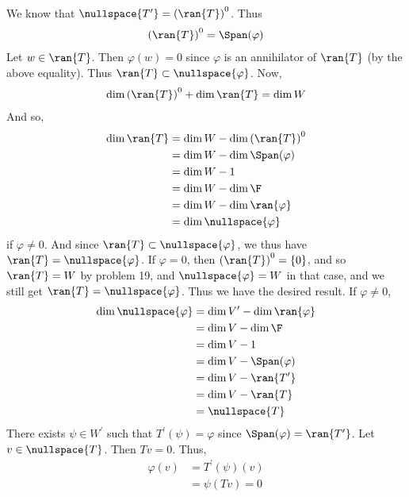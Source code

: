 \documentclass{book}
\begin{document}
\begin{enumerate}[label=\arabic*)]
      We know that $\nullspace{T^{\prime}} = \left( \ran{T} \right)^0$. Thus
      \begin{align*}
        \left( \ran{T} \right)^0 = \Span(\varphi)
      \end{align*}
      Let $w \in \ran{T}$. Then $\varphi(w) = 0$ since $\varphi$ is an annihilator of $\ran{T}$ (by the above equality). Thus $\ran{T} \subset \nullspace{\varphi}$. Now,
      \begin{align*}
        \dim{\left( \ran{T} \right)^0} + \dim{\ran{T}} & = \dim{W} \\
      \end{align*}
      And so,
      \begin{align*}
        \dim{\ran{T}} & = \dim{W} - \dim{\left( \ran{T} \right)^0} \\
        & = \dim{W} - \dim{\Span(\varphi)} \\
        & = \dim{W} - 1 \\
        & = \dim{W} - \dim{\F} \\
        & = \dim{W} - \dim{\ran{\varphi}} \\
        & = \dim{\nullspace{\varphi}}
      \end{align*}
      if $\varphi \neq 0$. And since $\ran{T} \subset \nullspace{\varphi}$, we thus have $\ran{T} = \nullspace{\varphi}$. If $\varphi = 0$, then $\left( \ran{T} \right)^0 = \{0\}$, and so
      $\ran{T} = W$ by problem 19, and $\nullspace{\varphi} = W$ in that case, and we still get $\ran{T} = \nullspace{\varphi}$. Thus we have the desired result.
    \ii
      If $\varphi \neq 0$,
      \begin{align*}
        \dim{\nullspace{\varphi}} & = \dim{V^{\prime}} - \dim{\ran{\varphi}} \\
        & = \dim{V} - \dim{\F} \\
        & = \dim{V} - 1 \\
        & = \dim{V} - \Span(\varphi) \\
        & = \dim{V} - \ran{T^{\prime}} \\
        & = \dim{V} - \ran{T} \\
        & = \nullspace{T}
      \end{align*}
      There exists $\psi \in W^{\prime}$ such that $T^{\prime}(\psi) = \varphi$ since $\Span(\varphi) = \ran{T^{\prime}}$. Let $v \in \nullspace{T}$. Then $Tv = 0$. Thus,
      \begin{align*}
        \varphi(v) & = T^{\prime}(\psi)(v) \\
        & = \psi(Tv) = 0

\end{align*}
\end{enumerate}
\end{document}
